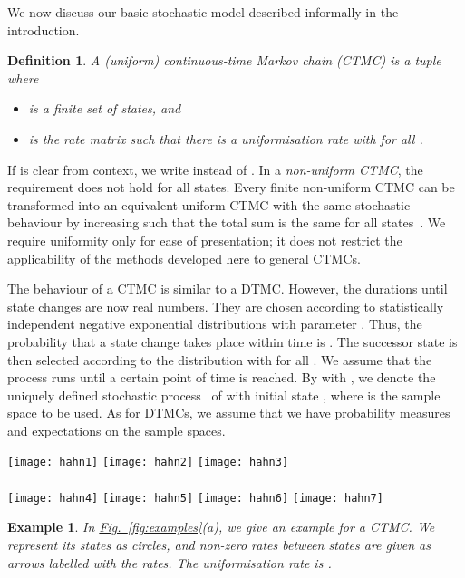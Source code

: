 \documentclass[10pt,twocolumn]{article}
\newtheorem{definition}{Definition}
\newtheorem{example}{Example}
\newcommand{\reffig}[1]{\texorpdfstring{\hyperref[fig:#1]{Fig.~\ref*{fig:#1}}}{Fig.~\ref*{fig:#1}}}
\begin{document}
We now discuss our basic stochastic model described informally in the introduction.
\begin{definition}
  \label{def:ctmc}
A \emph{(uniform) continuous-time Markov chain (CTMC)} is a tuple  where 
\begin{itemize}
  \item  is a finite set of \emph{states}, and
  \item  is the
    \emph{rate matrix} such that there is a \emph{uniformisation rate} 
    with  for all .
  \end{itemize}
\end{definition}
If  is clear from context, we write  instead of .
In a \emph{non-uniform CTMC}, the requirement  does not hold for all states.
Every finite non-uniform CTMC can be transformed into an equivalent uniform CTMC with the same stochastic behaviour by increasing 
 such that the total sum is the same for all states~\cite{Stewart94}.
We require uniformity only for ease of presentation; it does not restrict the applicability of the methods developed here to general CTMCs.

The behaviour of a CTMC  is similar to a DTMC.
However, the durations until state changes are now real numbers.
They are chosen according to statistically independent negative exponential distributions with parameter .
Thus, the probability that a state change takes place within time  is .
The successor state is then selected according to the distribution  with  for all .
We assume that the process runs until a certain point of time  is reached.
By  with ,
we denote the uniquely defined stochastic process~\cite{Stewart94} of  with initial state ,
where  is the sample space to be used.
As for DTMCs, we assume that we have probability measures and expectations on the sample spaces.
\begin{figure*}
\centering
\texttt{[image: hahn1]}
\hfill
\texttt{[image: hahn2]}
\hfill
\texttt{[image: hahn3]}
\ \\\ \\
\texttt{[image: hahn4]}
\hfill
\texttt{[image: hahn5]}
\hfill
\texttt{[image: hahn6]}
\hfill
\texttt{[image: hahn7]}
\caption{\label{fig:examples}Example models.}
\end{figure*}

\begin{example}
  \label{exa:ctmc}
In \reffig{examples}(a), we give an example for a CTMC.
  We represent its states as circles, and non-zero rates between states are given as arrows labelled with the rates.
  The uniformisation rate is .
\end{example}
\end{document}
